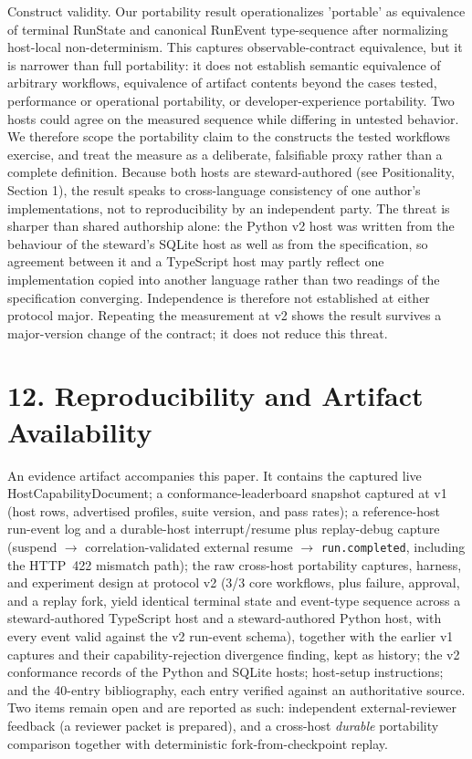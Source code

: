 \documentclass[11pt]{article}
\begin{document}
Construct validity. Our portability result operationalizes 'portable' as equivalence of terminal RunState and canonical RunEvent type-sequence after normalizing host-local non-determinism. This captures observable-contract equivalence, but it is narrower than full portability: it does not establish semantic equivalence of arbitrary workflows, equivalence of artifact contents beyond the cases tested, performance or operational portability, or developer-experience portability. Two hosts could agree on the measured sequence while differing in untested behavior. We therefore scope the portability claim to the constructs the tested workflows exercise, and treat the measure as a deliberate, falsifiable proxy rather than a complete definition. Because both hosts are steward-authored (see Positionality, Section 1), the result speaks to cross-language consistency of one author's implementations, not to reproducibility by an independent party. The threat is sharper than shared authorship alone: the Python v2 host was written from the behaviour of the steward's SQLite host as well as from the specification, so agreement between it and a TypeScript host may partly reflect one implementation copied into another language rather than two readings of the specification converging. Independence is therefore not established at either protocol major. Repeating the measurement at v2 shows the result survives a major-version change of the contract; it does not reduce this threat.

\section*{12. Reproducibility and Artifact Availability}
An evidence artifact accompanies this paper. It contains the captured live HostCapabilityDocument; a conformance-leaderboard snapshot captured at v1 (host rows, advertised profiles, suite version, and pass rates); a reference-host run-event log and a durable-host interrupt/resume plus replay-debug capture (suspend $\to$ correlation-validated external resume $\to$ \texttt{run.completed}, including the HTTP~422 mismatch path); the raw cross-host portability captures, harness, and experiment design at protocol v2 (3/3 core workflows, plus failure, approval, and a replay fork, yield identical terminal state and event-type sequence across a steward-authored TypeScript host and a steward-authored Python host, with every event valid against the v2 run-event schema), together with the earlier v1 captures and their capability-rejection divergence finding, kept as history; the v2 conformance records of the Python and SQLite hosts; host-setup instructions; and the 40-entry bibliography, each entry verified against an authoritative source. Two items remain open and are reported as such: independent external-reviewer feedback (a reviewer packet is prepared), and a cross-host \emph{durable} portability comparison together with deterministic fork-from-checkpoint replay.
\end{document}
